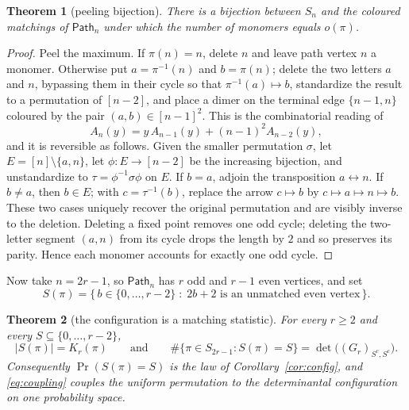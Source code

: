 \documentclass[11pt,a4paper]{article}
\theoremstyle{plain}
\newtheorem{theorem}{Theorem}[section]
\theoremstyle{definition}
\theoremstyle{remark}
\begin{document}
\begin{theorem}[peeling bijection]\label{thm:peel}
There is a bijection between $S_n$ and the coloured matchings of
$\mathsf{Path}_n$ under
which the number of monomers equals $o(\pi)$.
\end{theorem}

\begin{proof}
Peel the maximum. If $\pi(n)=n$, delete $n$ and leave path vertex $n$ a monomer.
Otherwise put $a=\pi^{-1}(n)$ and $b=\pi(n)$; delete the two letters $a$ and $n$,
bypassing them in their cycle so that $\pi^{-1}(a)\mapsto b$, standardize the
result to a permutation of $[n-2]$, and place a dimer on the terminal edge
$\{n-1,n\}$ coloured by the pair $(a,b)\in[n-1]^2$. This is the combinatorial
reading of
\[
  A_n(y)=y\,A_{n-1}(y)+(n-1)^2A_{n-2}(y),
\]
and it is reversible as follows. Given the smaller permutation $\sigma$, let
$E=[n]\setminus\{a,n\}$, let $\phi:E\to[n-2]$ be the increasing bijection, and
unstandardize to $\tau=\phi^{-1}\sigma\phi$ on $E$. If $b=a$, adjoin the
transposition $a\leftrightarrow n$. If $b\ne a$, then $b\in E$; with
$c=\tau^{-1}(b)$, replace the arrow $c\mapsto b$ by
$c\mapsto a\mapsto n\mapsto b$. These two cases uniquely recover the original
permutation and are visibly inverse to the deletion. Deleting a fixed point
removes one odd cycle; deleting the two-letter segment $(a,n)$ from its cycle
drops the length by $2$ and so preserves its parity. Hence each monomer accounts
for exactly one odd cycle.
\end{proof}

Now take $n=2r-1$, so $\mathsf{Path}_n$ has $r$ odd and $r-1$ even vertices,
and set
\begin{equation}\label{eq:coupling}
  S(\pi)=\bigl\{\,b\in\{0,\dots,r-2\}\;:\;2b+2\text{ is an unmatched even
  vertex}\,\bigr\}.
\end{equation}

\begin{theorem}[the configuration is a matching statistic]\label{thm:coupling}
For every $r\ge2$ and every $S\subseteq\{0,\dots,r-2\}$,
\[
  \bigl|S(\pi)\bigr|=K_r(\pi)
  \qquad\text{and}\qquad
  \#\{\pi\in S_{2r-1}:S(\pi)=S\}=\det\bigl((G_r)_{S^c,S^c}\bigr).
\]
Consequently $\Pr(S(\pi)=S)$ is the law of Corollary~\ref{cor:config}, and
\eqref{eq:coupling} couples the uniform permutation to the determinantal
configuration on one probability space.
\end{theorem}
\end{document}
